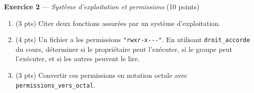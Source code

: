 \bigskip

\textbf{Exercice 2} --- \textit{Système d'exploitation et permissions} \hfill (10 points)

\begin{enumerate}
  \item (3 pts) Citer deux fonctions assurées par un système d'exploitation.
  \item (4 pts) Un fichier a les permissions \lstinline{"rwxr-x---"}. En utilisant \lstinline{droit_accorde} du cours, déterminer si le propriétaire peut l'exécuter, si le groupe peut l'exécuter, et si les autres peuvent le lire.
  \item (3 pts) Convertir ces permissions en notation octale avec \lstinline{permissions_vers_octal}.
\end{enumerate}

